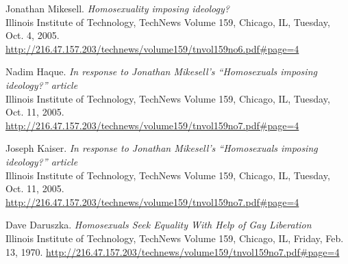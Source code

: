 \documentclass[a4paper,12pt]{article}
\begin{document}
\begin{thebibliography}{9}

Jonathan Mikesell.
\textit{Homosexuality imposing ideology?} \\
Illinois Institute of Technology, TechNews Volume 159, Chicago, IL, Tuesday, Oct. 4, 2005.
\url{http://216.47.157.203/technews/volume159/tnvol159no6.pdf\#page=4}

Nadim Haque.
\textit{In response to Jonathan Mikesell's “Homosexuals imposing ideology?” article} \\
Illinois Institute of Technology, TechNews Volume 159, Chicago, IL, Tuesday, Oct. 11, 2005.
\url{http://216.47.157.203/technews/volume159/tnvol159no7.pdf\#page=4}

Joseph Kaiser.
\textit{In response to Jonathan Mikesell's “Homosexuals imposing ideology?” article} \\
Illinois Institute of Technology, TechNews Volume 159, Chicago, IL, Tuesday, Oct. 11, 2005.
\url{http://216.47.157.203/technews/volume159/tnvol159no7.pdf\#page=4}

Dave Daruszka.
\textit{Homosexuals Seek Equality With Help of Gay Liberation} \\
Illinois Institute of Technology, TechNews Volume 159, Chicago, IL, Friday, Feb. 13, 1970.
\url{http://216.47.157.203/technews/volume159/tnvol159no7.pdf\#page=4}


\end{thebibliography}

\newpage

\end{document}
